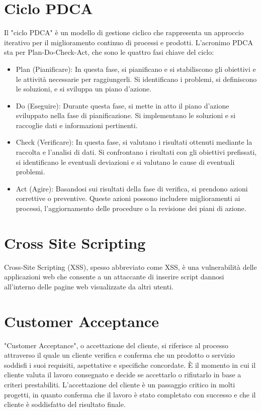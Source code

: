 \documentclass{article}
\begin{document}
\section{Ciclo PDCA}
 Il "ciclo PDCA" è un modello di gestione ciclico che rappresenta un approccio iterativo per il miglioramento continuo di processi e prodotti. L'acronimo PDCA sta per Plan-Do-Check-Act, che sono le quattro fasi chiave del ciclo:
\begin{itemize}
    \item Plan (Pianificare): In questa fase, si pianificano e si stabiliscono gli obiettivi e le attività necessarie per raggiungerli. Si identificano i problemi, si definiscono le soluzioni, e si sviluppa un piano d'azione.
    \item Do (Eseguire): Durante questa fase, si mette in atto il piano d'azione sviluppato nella fase di pianificazione. Si implementano le soluzioni e si raccoglie dati e informazioni pertinenti.
    \item Check (Verificare): In questa fase, si valutano i risultati ottenuti mediante la raccolta e l'analisi di dati. Si confrontano i risultati con gli obiettivi prefissati, si identificano le eventuali deviazioni e si valutano le cause di eventuali problemi.
    \item Act (Agire): Basandosi sui risultati della fase di verifica, si prendono azioni correttive o preventive. Queste azioni possono includere miglioramenti ai processi, l'aggiornamento delle procedure o la revisione dei piani di azione.
\end{itemize}

\section{Cross Site Scripting}
Cross-Site Scripting (XSS), spesso abbreviato come XSS, è una vulnerabilità delle applicazioni web che consente a un attaccante di inserire script dannosi all'interno delle pagine web visualizzate da altri utenti.

\section{Customer Acceptance}
"Customer Acceptance", o accettazione del cliente, si riferisce al processo attraverso il quale un cliente verifica e conferma che un prodotto o servizio soddisfi i suoi requisiti, aspettative e specifiche concordate. È il momento in cui il cliente valuta il lavoro consegnato e decide se accettarlo o rifiutarlo in base a criteri prestabiliti. L'accettazione del cliente è un passaggio critico in molti progetti, in quanto conferma che il lavoro è stato completato con successo e che il cliente è soddisfatto del risultato finale.
\end{document}
